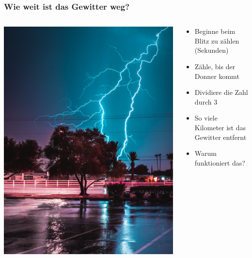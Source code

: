 \documentclass{beamer}
\begin{document}
\begin{frame}
\frametitle{Wie weit ist das Gewitter weg?}

\begin{columns}[c]

\begin{column}{5cm}

\begin{center}
\includegraphics[width=\textwidth]{gewitter.jpg}
\end{center}



\end{column}

\begin{column}{5cm}

\begin{itemize}
\item
Beginne beim Blitz zu zählen (Sekunden)
\item
Zähle, bis der Donner kommt
\item
Dividiere die Zahl durch 3
\item
So viele Kilometer ist das Gewitter entfernt
\item
\textcolor{theme}{Warum funktioniert das?}
\end{itemize}


\end{column}

\end{columns}


\end{frame}
\end{document}

